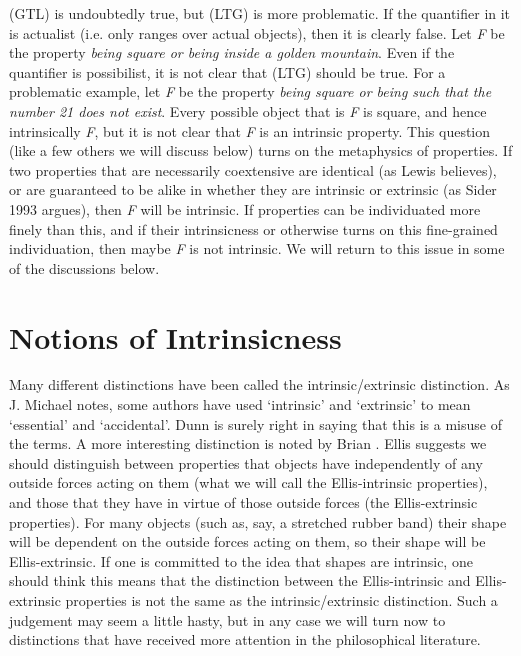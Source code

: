 \noindent (GTL) is undoubtedly true, but (LTG) is more problematic. If the quantifier in it is actualist (i.e. only ranges over actual objects), then it is clearly false. Let \textit{F} be the property \textit{being square or being inside a golden mountain}. Even if the quantifier is possibilist, it is not clear that (LTG) should be true. For a problematic example, let \textit{F} be the property \textit{being square or being such that the number 21 does not exist}. Every possible object that is \textit{F} is square, and hence intrinsically \textit{F}, but it is not clear that \textit{F} is an intrinsic property. This question (like a few others we will discuss below) turns on the metaphysics of properties. If two properties that are necessarily coextensive are identical (as Lewis believes), or are guaranteed to be alike in whether they are intrinsic or extrinsic (as Sider 1993 argues), then \textit{F} will be intrinsic. If properties can be individuated more finely than this, and if their intrinsicness or otherwise turns on this fine-grained individuation, then maybe \textit{F} is not intrinsic. We will return to this issue in some of the discussions below.

\section{Notions of Intrinsicness}
Many different distinctions have been called the intrinsic/extrinsic distinction. As J. Mich\-ael \citet{Dunn1990} notes, some authors have used `intrinsic' and `extrinsic' to mean `essential' and `accidental'. Dunn is surely right in saying that this is a misuse of the terms. A more interesting distinction is noted by Brian \cite[discussed in Humberstone (1996)]{Ellis2001}. Ellis suggests we should distinguish between properties that objects have independently of any outside forces acting on them (what we will call the Ellis-intrinsic properties), and those that they have in virtue of those outside forces (the Ellis-extrinsic properties). For many objects (such as, say, a stretched rubber band) their shape will be dependent on the outside forces acting on them, so their shape will be Ellis-extrinsic. If one is committed to the idea that shapes are intrinsic, one should think this means that the distinction between the Ellis-intrinsic and Ellis-extrinsic properties is not the same as the intrinsic/extrinsic distinction. Such a judgement may seem a little hasty, but in any case we will turn now to distinctions that have received more attention in the philosophical literature.

